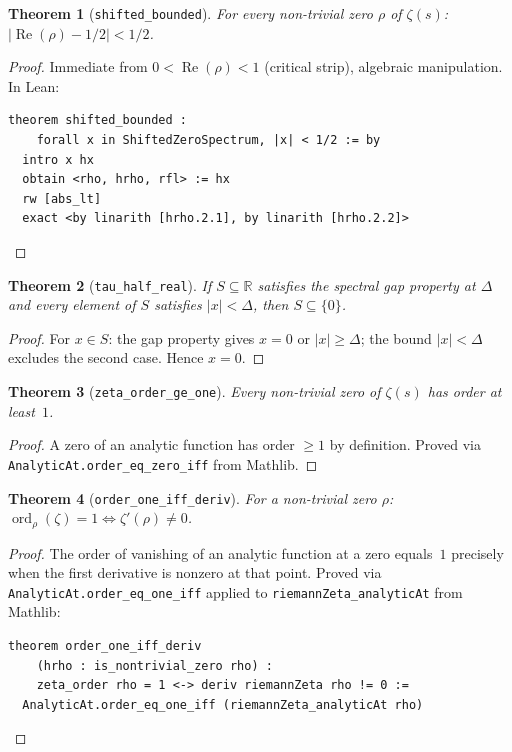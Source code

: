 \documentclass[12pt, a4paper]{article}
\theoremstyle{plain}
\newtheorem{theorem}{Theorem}[section]
\theoremstyle{definition}
\newcommand{\R}{\mathbb{R}}
\newcommand{\re}{\operatorname{Re}}
\newcommand{\zetaord}{\operatorname{ord}}
\newcommand{\lean}[1]{\texttt{#1}}
\begin{document}
\begin{theorem}[\lean{shifted\_bounded}]
\label{thm:shifted_bounded}
For every non-trivial zero $\rho$ of $\zeta(s)$:
$|\re(\rho) - 1/2| < 1/2$.
\end{theorem}

\begin{proof}
Immediate from $0 < \re(\rho) < 1$ (critical strip), algebraic manipulation.
In Lean:
\begin{lstlisting}[language=Lean4]
theorem shifted_bounded :
    forall x in ShiftedZeroSpectrum, |x| < 1/2 := by
  intro x hx
  obtain <rho, hrho, rfl> := hx
  rw [abs_lt]
  exact <by linarith [hrho.2.1], by linarith [hrho.2.2]>
\end{lstlisting}
\end{proof}

\begin{theorem}[\lean{tau\_half\_real}]
\label{thm:tau_half}
If $S \subseteq \R$ satisfies the spectral gap property at $\Delta$
and every element of $S$ satisfies $|x| < \Delta$,
then $S \subseteq \{0\}$.
\end{theorem}

\begin{proof}
For $x \in S$: the gap property gives $x = 0$ or $|x| \geq \Delta$;
the bound $|x| < \Delta$ excludes the second case. Hence $x = 0$.
\end{proof}

\begin{theorem}[\lean{zeta\_order\_ge\_one}]
\label{thm:order_ge_one}
Every non-trivial zero of $\zeta(s)$ has order at least~$1$.
\end{theorem}

\begin{proof}
A zero of an analytic function has order $\geq 1$ by definition.
Proved via \lean{AnalyticAt.order\_eq\_zero\_iff} from Mathlib.
\end{proof}

\begin{theorem}[\lean{order\_one\_iff\_deriv}]
\label{thm:order_iff}
For a non-trivial zero $\rho$:
$\zetaord_\rho(\zeta) = 1 \iff \zeta'(\rho) \neq 0$.
\end{theorem}

\begin{proof}
The order of vanishing of an analytic function at a zero equals~$1$
precisely when the first derivative is nonzero at that point.
Proved via \lean{AnalyticAt.order\_eq\_one\_iff} applied to
\lean{riemannZeta\_analyticAt} from Mathlib:
\begin{lstlisting}[language=Lean4]
theorem order_one_iff_deriv
    (hrho : is_nontrivial_zero rho) :
    zeta_order rho = 1 <-> deriv riemannZeta rho != 0 :=
  AnalyticAt.order_eq_one_iff (riemannZeta_analyticAt rho)
\end{lstlisting}
\end{proof}
\end{document}
